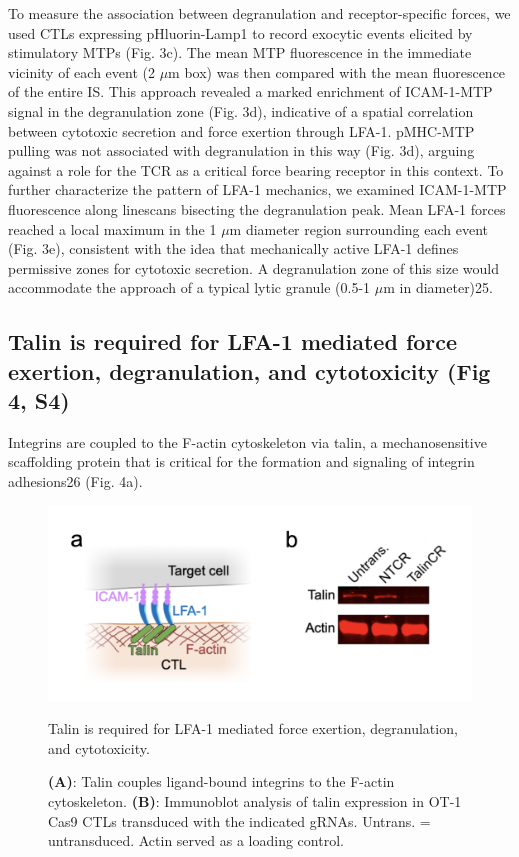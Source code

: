 To measure the association between degranulation and receptor-specific forces, we used CTLs expressing pHluorin-Lamp1 to record exocytic events elicited by stimulatory MTPs (Fig. 3c). The mean MTP fluorescence in the immediate vicinity of each event (2 $\mu$m box) was then compared with the mean fluorescence of the entire IS. This approach revealed a marked enrichment of ICAM-1-MTP signal in the degranulation zone (Fig. 3d), indicative of a spatial correlation between cytotoxic secretion and force exertion through LFA-1. pMHC-MTP pulling was not associated with degranulation in this way (Fig. 3d), arguing against a role for the TCR as a critical force bearing receptor in this context. To further characterize the pattern of LFA-1 mechanics, we examined ICAM-1-MTP fluorescence along linescans bisecting the degranulation peak. Mean LFA-1 forces reached a local maximum in the 1 $\mu$m diameter region surrounding each event (Fig. 3e), consistent with the idea that mechanically active LFA-1 defines permissive zones for cytotoxic secretion. A degranulation zone of this size would accommodate the approach of a typical lytic granule (0.5-1 $\mu$m in diameter)25. 

\subsection{Talin is required for LFA-1 mediated force exertion, degranulation, and cytotoxicity (Fig 4, S4)}
Integrins are coupled to the F-actin cytoskeleton via talin, a mechanosensitive scaffolding protein that is critical for the formation and signaling of integrin adhesions26 (Fig. 4a).  

\begin{figure}[htbp]
	\centering
	\includegraphics[width=1.0\columnwidth]{../figures/chapter3/fig4model.png}
	\caption{Talin is required for LFA-1 mediated force exertion, degranulation, and
cytotoxicity.}
	\caption*{\textbf{(A)}: Talin couples ligand-bound integrins to the F-actin cytoskeleton. \textbf{(B)}: Immunoblot analysis of talin expression in OT-1 Cas9 CTLs transduced with the indicated gRNAs. Untrans. = untransduced. Actin served as a loading control.}
	\label{fig:fig4model}
\end{figure} 

